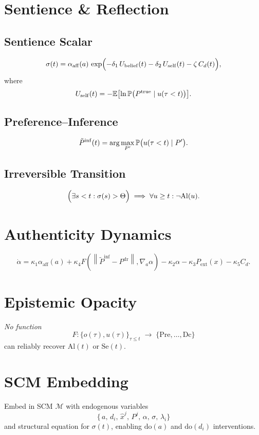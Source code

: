 \documentclass{article}
\begin{document}
\section{Sentience \& Reflection}
\subsection{Sentience Scalar}
\[
\sigma(t) = \alpha_{\rm aff}(a)\,\exp\Bigl(-\delta_1\,U_{\rm belief}(t) -\delta_2\,U_{\rm self}(t) -\zeta\,C_d(t)\Bigr),
\]
where
\[
U_{\rm self}(t) = -\mathbb E\bigl[\ln \mathbb P\bigl(P^{\rm true}\mid u(\tau<t)\bigr)\bigr].
\]
\subsection{Preference--Inference}
\[
\tilde P^{\rm inf}(t) = \arg\max_{P'} \mathbb P\bigl(u(\tau<t)\mid P'\bigr).
\]
\subsection{Irreversible Transition}
\[
\Bigl(\exists s<t:\sigma(s)>\Theta\Bigr)\;\Longrightarrow\;\forall u\ge t:\neg \mathrm{Al}(u).
\]

\section{Authenticity Dynamics}
\[
\dot{\alpha} = \kappa_1 \alpha_{\mathrm{aff}}(a) + \kappa_4 F\left(\left\|\tilde{P}^{\mathrm{inf}} - P^{\mathrm{dr}}\right\|, \nabla_a \alpha \right) - \kappa_2 \alpha - \kappa_3 P_{\mathrm{ext}}(x) - \kappa_5 C_d.
\]

\section{Epistemic Opacity}
\emph{No function}
\[
F:\{o(\tau),u(\tau)\}_{\tau\le t}\;\to\;\{\mathrm{Pre},\dots,\mathrm{Dc}\}
\]
can reliably recover $\mathrm{Al}(t)$ or $\mathrm{Se}(t)$.

\section{SCM Embedding}
Embed in SCM $\mathcal M$ with endogenous variables
\[
\{\,a,\,d_i,\,\hat x^j,\,P^j,\,\alpha,\,\sigma,\,\lambda_i\}
\]
and structural equation for $\sigma(t)$, enabling $\mathrm{do}(a)$ and $\mathrm{do}(d_i)$ interventions.

\end{document}
